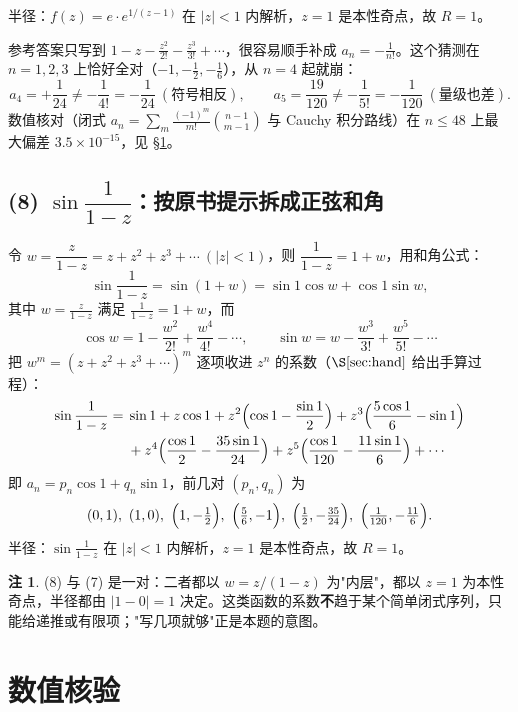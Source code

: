 \documentclass[11pt,a4paper]{ctexart}
\theoremstyle{definition}
\newtheorem{remark}[theorem]{注}
\begin{document}
半径：$f(z)=e\cdot e^{1/(z-1)}$ 在 $|z|<1$ 内解析，$z=1$ 是本性奇点，故 $R=1$。

\begin{warnbox}
参考答案只写到 $1-z-\frac{z^2}{2!}-\frac{z^3}{3!}+\cdots$，很容易顺手补成 $a_n=-\frac1{n!}$。这个猜测在 $n=1,2,3$ 上恰好全对（$-1,-\frac12,-\frac16$），从 $n=4$ 起就崩：
\[
a_4=+\frac1{24}\neq-\frac1{4!}=-\frac1{24}\ (\text{符号相反}),\qquad
a_5=\frac{19}{120}\neq-\frac1{5!}=-\frac1{120}\ (\text{量级也差}).
\]
数值核对（闭式 $a_n=\sum_m\frac{(-1)^m}{m!}\binom{n-1}{m-1}$ 与 Cauchy 积分路线）在 $n\le48$ 上最大偏差 $3.5\times10^{-15}$，见 \S\ref{sec:num}。
\end{warnbox}

\subsection{(8) $\sin\dfrac{1}{1-z}$：按原书提示拆成正弦和角}
令 $w=\dfrac{z}{1-z}=z+z^2+z^3+\cdots\ (|z|<1)$，则 $\dfrac1{1-z}=1+w$，用和角公式：
\[
\sin\frac1{1-z}=\sin(1+w)=\sin1\cos w+\cos1\sin w,
\]
其中 $w=\frac{z}{1-z}$ 满足 $\frac{1}{1-z}=1+w$，而
\[
\cos w=1-\frac{w^2}{2!}+\frac{w^4}{4!}-\cdots,\qquad
\sin w=w-\frac{w^3}{3!}+\frac{w^5}{5!}-\cdots
\]
把 $w^m=(z+z^2+z^3+\cdots)^m$ 逐项收进 $z^n$ 的系数（$\S\ref{sec:hand}$ 给出手算过程）：
\[
\begin{aligned}
\sin\frac1{1-z}={}&\sin1+z\cos1+z^2\Bigl(\cos1-\frac{\sin1}{2}\Bigr)
+z^3\Bigl(\frac{5\cos1}{6}-\sin1\Bigr)\\
&+z^4\Bigl(\frac{\cos1}{2}-\frac{35\sin1}{24}\Bigr)
+z^5\Bigl(\frac{\cos1}{120}-\frac{11\sin1}{6}\Bigr)+\cdots
\end{aligned}
\]
即 $a_n=p_n\cos1+q_n\sin1$，前几对 $(p_n,q_n)$ 为
\[
(0,1),\ (1,0),\ \Bigl(1,-\tfrac12\Bigr),\ \Bigl(\tfrac56,-1\Bigr),\
\Bigl(\tfrac12,-\tfrac{35}{24}\Bigr),\ \Bigl(\tfrac1{120},-\tfrac{11}6\Bigr).
\]
半径：$\sin\frac1{1-z}$ 在 $|z|<1$ 内解析，$z=1$ 是本性奇点，故 $R=1$。

\begin{remark}
(8) 与 (7) 是一对：二者都以 $w=z/(1-z)$ 为"内层"，都以 $z=1$ 为本性奇点，半径都由 $|1-0|=1$ 决定。这类函数的系数\textbf{不}趋于某个简单闭式序列，只能给递推或有限项；"写几项就够"正是本题的意图。
\end{remark}

\section{数值核验}\label{sec:num}
\end{document}
